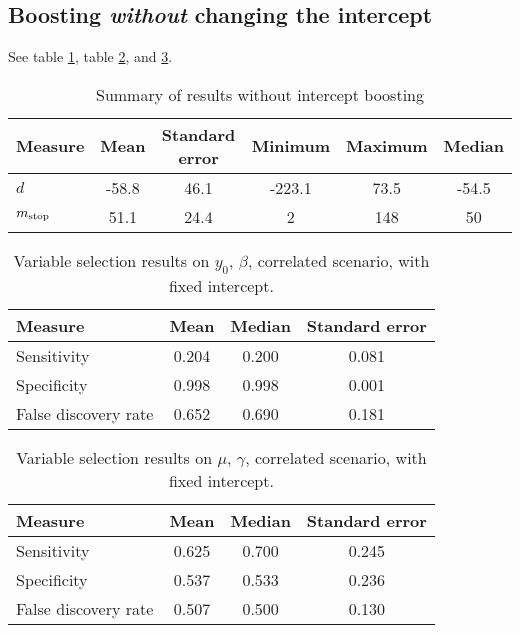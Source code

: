 \subsection{Boosting \textit{without} changing the intercept}
See table \ref{table:correlated-no-intercept-summary}, table \ref{table:correlated-no-intercept-y0}, and \ref{table:correlated-no-intercept-mu}.
\begin{table}
\caption{Summary of results without intercept boosting}
\label{table:correlated-no-intercept-summary}
\centering
\begin{tabular}{lccccc}
\toprule
Measure &    Mean &     Standard error &  Minimum & Maximum & Median \\
\hline
$d$    &    -58.8 & 46.1 &  -223.1  &   73.5 & -54.5 \\
$m_{\text{stop}}$      &    51.1 & 24.4 &     2 &   148 & 50 \\
\bottomrule
\end{tabular}
\end{table}

\begin{table}
\caption{Variable selection results on $y_0$, $\beta$, correlated scenario, with fixed intercept.}
\label{table:correlated-no-intercept-y0}
\centering
\begin{tabular}{lccc}
\toprule
Measure &  Mean & Median &   Standard error \\
\hline
Sensitivity &    0.204 &    0.200 &  0.081 \\
Specificity &    0.998 &    0.998 &  0.001 \\
False discovery rate & 0.652 &    0.690 &  0.181 \\
\bottomrule
\end{tabular}
\end{table}


\begin{table}
\caption{Variable selection results on $\mu$, $\gamma$, correlated scenario, with fixed intercept.}
\label{table:correlated-no-intercept-mu}
\centering
\begin{tabular}{lccc}
\toprule
Measure     & Mean &Median  & Standard error     \\
\hline
Sensitivity & 0.625 &  0.700 & 0.245 \\
Specificity & 0.537 &  0.533 & 0.236 \\
False discovery rate         & 0.507 &  0.500 & 0.130 \\
\bottomrule
\end{tabular}
\end{table}


